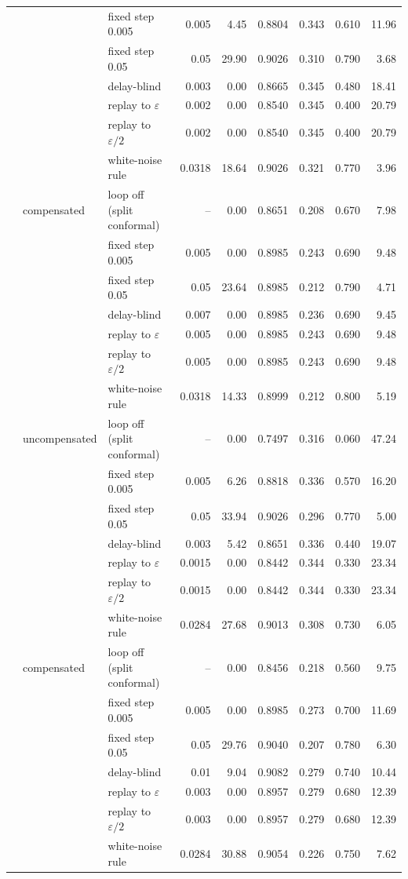 \begin{tabular}{@{}rllrrrrrr@{}}
 &  & fixed step 0.005 & 0.005 & 4.45 & 0.8804 & 0.343 & 0.610 & 11.96 \\
 &  & fixed step 0.05 & 0.05 & 29.90 & 0.9026 & 0.310 & 0.790 & 3.68 \\
 &  & delay-blind & 0.003 & 0.00 & 0.8665 & 0.345 & 0.480 & 18.41 \\
 &  & replay to $\varepsilon$ & 0.002 & 0.00 & 0.8540 & 0.345 & 0.400 & 20.79 \\
 &  & replay to $\varepsilon/2$ & 0.002 & 0.00 & 0.8540 & 0.345 & 0.400 & 20.79 \\
 &  & white-noise rule & 0.0318 & 18.64 & 0.9026 & 0.321 & 0.770 & 3.96 \\
 & compensated & loop off (split conformal) & -- & 0.00 & 0.8651 & 0.208 & 0.670 & 7.98 \\
 &  & fixed step 0.005 & 0.005 & 0.00 & 0.8985 & 0.243 & 0.690 & 9.48 \\
 &  & fixed step 0.05 & 0.05 & 23.64 & 0.8985 & 0.212 & 0.790 & 4.71 \\
 &  & delay-blind & 0.007 & 0.00 & 0.8985 & 0.236 & 0.690 & 9.45 \\
 &  & replay to $\varepsilon$ & 0.005 & 0.00 & 0.8985 & 0.243 & 0.690 & 9.48 \\
 &  & replay to $\varepsilon/2$ & 0.005 & 0.00 & 0.8985 & 0.243 & 0.690 & 9.48 \\
 &  & white-noise rule & 0.0318 & 14.33 & 0.8999 & 0.212 & 0.800 & 5.19 \\
\addlinespace
12 & uncompensated & loop off (split conformal) & -- & 0.00 & 0.7497 & 0.316 & 0.060 & 47.24 \\
 &  & fixed step 0.005 & 0.005 & 6.26 & 0.8818 & 0.336 & 0.570 & 16.20 \\
 &  & fixed step 0.05 & 0.05 & 33.94 & 0.9026 & 0.296 & 0.770 & 5.00 \\
 &  & delay-blind & 0.003 & 5.42 & 0.8651 & 0.336 & 0.440 & 19.07 \\
 &  & replay to $\varepsilon$ & 0.0015 & 0.00 & 0.8442 & 0.344 & 0.330 & 23.34 \\
 &  & replay to $\varepsilon/2$ & 0.0015 & 0.00 & 0.8442 & 0.344 & 0.330 & 23.34 \\
 &  & white-noise rule & 0.0284 & 27.68 & 0.9013 & 0.308 & 0.730 & 6.05 \\
 & compensated & loop off (split conformal) & -- & 0.00 & 0.8456 & 0.218 & 0.560 & 9.75 \\
 &  & fixed step 0.005 & 0.005 & 0.00 & 0.8985 & 0.273 & 0.700 & 11.69 \\
 &  & fixed step 0.05 & 0.05 & 29.76 & 0.9040 & 0.207 & 0.780 & 6.30 \\
 &  & delay-blind & 0.01 & 9.04 & 0.9082 & 0.279 & 0.740 & 10.44 \\
 &  & replay to $\varepsilon$ & 0.003 & 0.00 & 0.8957 & 0.279 & 0.680 & 12.39 \\
 &  & replay to $\varepsilon/2$ & 0.003 & 0.00 & 0.8957 & 0.279 & 0.680 & 12.39 \\
 &  & white-noise rule & 0.0284 & 30.88 & 0.9054 & 0.226 & 0.750 & 7.62 \\
\bottomrule
\end{tabular}
